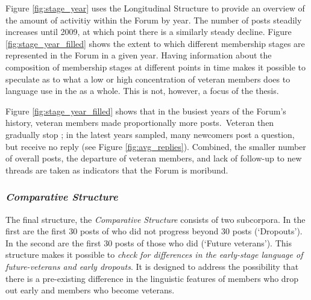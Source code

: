Figure \ref{fig:stage_year} uses the Longitudinal Structure to provide an overview of the amount of activitiy within the \gls{Forum} by year. The number of \glspl{post} steadily increases until 2009, at which point there is a similarly steady decline. Figure \ref{fig:stage_year_filled} shows the extent to which different membership stages are represented in the \gls{Forum} in a given year. Having information about the composition of membership stages at different points in time makes it possible to speculate as to what a low or high concentration of veteran members does to language use in the  as a whole. This is not, however, a focus of the thesis.

Figure \ref{fig:stage_year_filled} shows that in the busiest years of the \gls{Forum}'s history, veteran \glspl{member} made proportionally more \glspl{post}.~Veteran  then gradually stop ; in the latest years sampled, many newcomers \gls{post} a question, but receive no reply (see Figure \ref{fig:avg_replies}). Combined, the smaller number of overall \glspl{post}, the departure of veteran \glspl{member}, and lack of follow\hyp{}up to new \glspl{thread} are taken as indicators that the \gls{Forum} is moribund.

\subsubsection*{\emph{Comparative Structure}}

The final structure, the \emph{Comparative Structure} consists of two subcorpora. In the first are the first 30 \glspl{post} of  who did not progress beyond 30 \glspl{post} (`Dropouts'). In the second are the first 30 \glspl{post} of those  who did (`Future veterans'). This structure makes it possible to \emph{check for differences in the early\hyp{}stage language of future\hyp{}veterans and early dropouts}. It is designed to address the possibility that there is a pre\hyp{}existing difference in the linguistic features of \glspl{member} who drop out early and \glspl{member} who become veterans.

